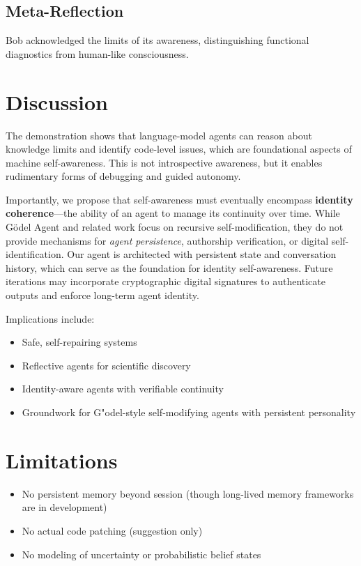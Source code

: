 \documentclass[11pt]{article}
\begin{document}
\subsection{Meta-Reflection}
Bob acknowledged the limits of its awareness, distinguishing functional diagnostics from human-like consciousness.

\section{Discussion}
The demonstration shows that language-model agents can reason about knowledge limits and identify code-level issues, which are foundational aspects of machine self-awareness. This is not introspective awareness, but it enables rudimentary forms of debugging and guided autonomy.

Importantly, we propose that self-awareness must eventually encompass \textbf{identity coherence}—the ability of an agent to manage its continuity over time. While Gödel Agent and related work focus on recursive self-modification, they do not provide mechanisms for \textit{agent persistence}, authorship verification, or digital self-identification. Our agent is architected with persistent state and conversation history, which can serve as the foundation for identity self-awareness. Future iterations may incorporate cryptographic digital signatures to authenticate outputs and enforce long-term agent identity.

Implications include:
\begin{itemize}
    \item Safe, self-repairing systems
    \item Reflective agents for scientific discovery
    \item Identity-aware agents with verifiable continuity
    \item Groundwork for G"odel-style self-modifying agents with persistent personality
\end{itemize}

\section{Limitations}
\begin{itemize}
    \item No persistent memory beyond session (though long-lived memory frameworks are in development)
    \item No actual code patching (suggestion only)
    \item No modeling of uncertainty or probabilistic belief states
\end{itemize}
\end{document}
